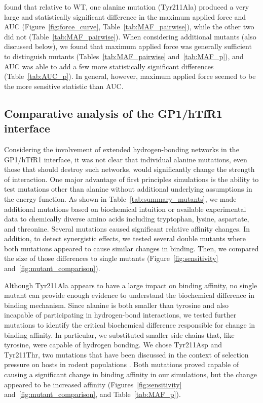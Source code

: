\documentclass[12pt]{article}
\providecommand{\DIFadd}[1]{{\protect\color{blue}\uwave{#1}}} %
\providecommand{\DIFaddend}{} %
\begin{document}
\DIFadd{We }\DIFaddend found that relative to WT, one alanine mutation (Tyr211Ala) produced a very large and statistically significant difference in the maximum applied force and AUC (Figure~\ref{fig:force_curve}, Table~\ref{tab:MAF_pairwise}), while the other two did not (Table~\ref{tab:MAF_pairwise}). When considering additional mutants (also discussed below), we found that maximum applied force was generally sufficient to distinguish mutants (Tables~\ref{tab:MAF_pairwise} and~\ref{tab:MAF_p}), and AUC was able to add a few more statistically significant differences (Table~\ref{tab:AUC_p}). In general, however, maximum applied force seemed to be the more sensitive statistic than AUC.

\subsection{Comparative analysis of the GP1/hTfR1 interface}
Considering the involvement of extended hydrogen-bonding networks in the GP1/hTfR1 interface, it was not clear that individual alanine mutations, even those that should destroy such networks, would significantly change the strength of interaction. One major advantage of first principles simulations is the ability to test mutations other than alanine without additional underlying assumptions in the energy function. As shown in Table~\ref{tab:summary_mutants}, we made additional mutations based on biochemical intuition or available experimental data to chemically diverse amino acids including tryptophan, lysine, aspartate, and threonine. Several mutations caused significant relative affinity changes. In addition, to detect synergistic effects, we tested several double mutants where both mutations appeared to cause similar changes in binding. Then, we compared the size of those differences to single mutants (Figure~\ref{fig:sensitivity} and~\ref{fig:mutant_comparison}).

Although Tyr211Ala appears to have a large impact on binding affinity, no single mutant can provide enough evidence to understand the biochemical difference in binding mechanism. Since alanine is both smaller than tyrosine and also incapable of participating in hydrogen-bond interactions, we tested further mutations to identify the critical biochemical difference responsible for change in binding affinity. In particular, we substituted smaller side chains that, like tyrosine, were capable of hydrogen bonding. We chose Tyr211Asp and Tyr211Thr, two mutations that have been discussed in the context of selection pressure on hosts in rodent populations \citep{Rad2008,Rad20111,Rad20112}. Both mutations proved capable of causing a significant change in binding affinity in our simulations, but the change appeared to be increased affinity (Figures~\ref{fig:sensitivity} and~\ref{fig:mutant_comparison}, and Table~\ref{tab:MAF_p}).
\end{document}
